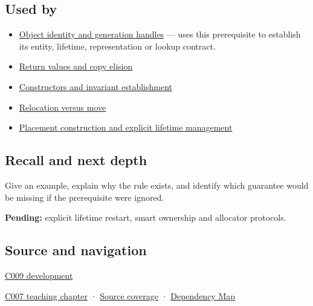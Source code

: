 \subsection{Used by}\label{appendix-a82f9c438857-used-by}

\begin{itemize}
\tightlist
\item
  \hyperref[appendix-f1581457d322]{Object identity and generation handles} --- uses this prerequisite to establish its entity, lifetime, representation or lookup contract.
\item
  \hyperref[appendix-b08d3788c5c6]{Return values and copy elision}
\item
  \hyperref[appendix-7f8ec83d0886]{Constructors and invariant establishment}
\item
  \hyperref[appendix-adfd6397af8d]{Relocation versus move}
\item
  \hyperref[appendix-f56c3e43fd4e]{Placement construction and explicit lifetime management}
\end{itemize}

\subsection{Recall and next depth}\label{appendix-a82f9c438857-recall-and-next-depth}

Give an example, explain why the rule exists, and identify which guarantee would be missing if the prerequisite were ignored.

\textbf{Pending:} explicit lifetime restart, smart ownership and allocator protocols.

\subsection{Source and navigation}\label{appendix-a82f9c438857-source-and-navigation}

\hyperref[appendix-fd090d982a15-m009---parts-127-147]{C009 development}

\hyperref[01-foundations-i-ch002-storage-is-a-place-an-object-is-its-occupant]{C007 teaching chapter} · \hyperref[appendix-fd090d982a15-m007---parts-101-112]{Source coverage} · \hyperref[appendix-4ad47bdd269a]{Dependency Map}
